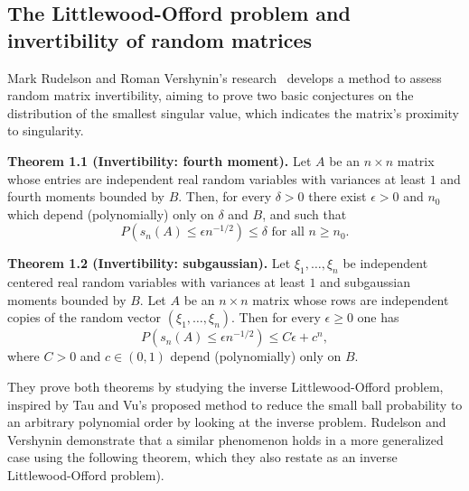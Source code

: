 \newpage
\subsection{The Littlewood-Offord problem and invertibility of random matrices}

Mark Rudelson and Roman Vershynin's research~\cite{rudelson2008littlewood} develops a method to assess random matrix invertibility,  aiming to prove two basic conjectures on the distribution of the smallest singular value, which indicates the matrix's proximity to singularity.\newline

\textbf{Theorem 1.1 (Invertibility: fourth moment).} Let \(A\) be an \(n \times n\) matrix whose entries are independent real random variables with variances at least \(1\) and fourth moments bounded by \(B\). Then, for every \(\delta > 0\) there exist \(\epsilon > 0\) and \(n_0\) which depend (polynomially) only on \(\delta\) and \(B\), and such that
\begin{equation*}
    P(s_n(A) \leq \epsilon n^{-1/2}) \leq \delta \text{ for all } n \geq n_0.
\end{equation*}

\textbf{Theorem 1.2 (Invertibility: subgaussian).} Let \(\xi_1, \ldots, \xi_n\) be independent centered real random variables with variances at least \(1\) and subgaussian moments bounded by \(B\). Let \(A\) be an \(n \times n\) matrix whose rows are independent copies of the random vector \((\xi_1, \ldots, \xi_n)\). Then for every \(\epsilon \geq 0\) one has
\begin{equation*}
    P(s_n(A) \leq \epsilon n^{-1/2}) \leq C\epsilon + c^n,
\end{equation*}
where \(C > 0\) and \(c \in (0, 1)\) depend (polynomially) only on \(B\).\newline

They prove both theorems by studying the inverse Littlewood-Offord problem, inspired by Tau and Vu's proposed method to reduce the small ball probability to an arbitrary polynomial order by looking at the inverse problem. Rudelson and Vershynin demonstrate that a similar phenomenon holds in a more generalized case using the following theorem, which they also restate as an inverse Littlewood-Offord problem).\newline

